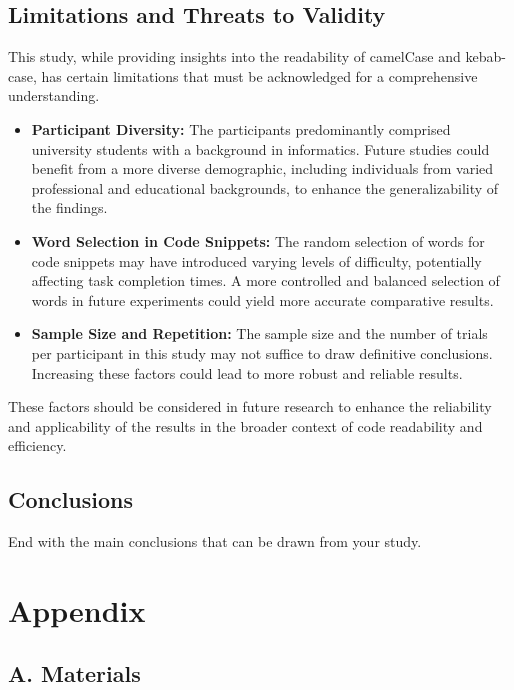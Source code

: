 \documentclass{article}
\begin{document}
\subsection{Limitations and Threats to Validity}
This study, while providing insights into the readability of camelCase and kebab-case, has certain limitations that must be acknowledged for a comprehensive understanding.

\begin{itemize}
  \item \textbf{Participant Diversity:} The participants predominantly comprised university students with a background in informatics. Future studies could benefit from a more diverse demographic, including individuals from varied professional and educational backgrounds, to enhance the generalizability of the findings.

  \item \textbf{Word Selection in Code Snippets:} The random selection of words for code snippets may have introduced varying levels of difficulty, potentially affecting task completion times. A more controlled and balanced selection of words in future experiments could yield more accurate comparative results.

  \item \textbf{Sample Size and Repetition:} The sample size and the number of trials per participant in this study may not suffice to draw definitive conclusions. Increasing these factors could lead to more robust and reliable results.
\end{itemize}

These factors should be considered in future research to enhance the reliability and applicability of the results in the broader context of code readability and efficiency.

\subsection{Conclusions}

End with the main conclusions that can be drawn from your study.


\section{Appendix}
\subsection*{A. Materials}
\end{document}
